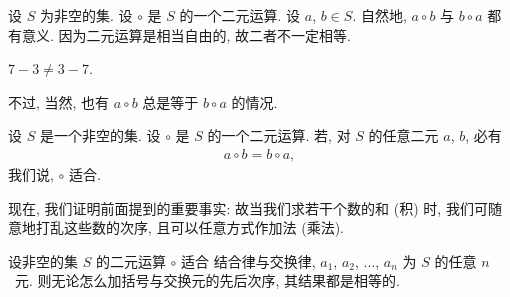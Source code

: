 \documentclass[%
    UTF8,%
    fontset=none,%
    punct=kaiming,%
    zihao=-4,%
    a4paper,%
    oneside,%
]{ctexbook}
\let\emph\relax
\begin{document}
设 \(S\) 为非空的集.
设 \(\circ\) 是 \(S\) 的一个二元运算.
设 \(a\), \(b \in S\).
自然地, \(a \circ b\) 与 \(b \circ a\) 都有意义.
因为二元运算是相当自由的,
故二者不一定相等.

\begin{example}
    \(
    7 - 3 \neq 3 - 7.
    \)
\end{example}

不过, 当然, 也有 \(a \circ b\)
总是等于 \(b \circ a\)
的情况.

\begin{definition}
    设 \(S\) 是一个非空的集.
    设 \(\circ\) 是 \(S\) 的一个二元运算.
    若, 对 \(S\) 的任意二元 \(a\), \(b\),
    必有
    \begin{align*}
        a \circ b = b \circ a,
    \end{align*}
    我们说, \(\circ\) 适合\emph{交换律}.
\end{definition}

现在, 我们证明前面提到的重要事实:
故当我们求若干个数的和 (积) 时,
我们可随意地打乱这些数的次序,
且可以任意方式作加法 (乘法).

\begin{theorem}
    设非空的集 \(S\) 的二元运算 \(\circ\) 适合%
    结合律与交换律,
    \(a_1\), \(a_2\), \(\dots\), \(a_n\) 为 \(S\) 的任意 \(n\)~元.
    则无论怎么加括号与交换元的先后次序,
    其结果都是相等的.
\end{theorem}
\end{document}
